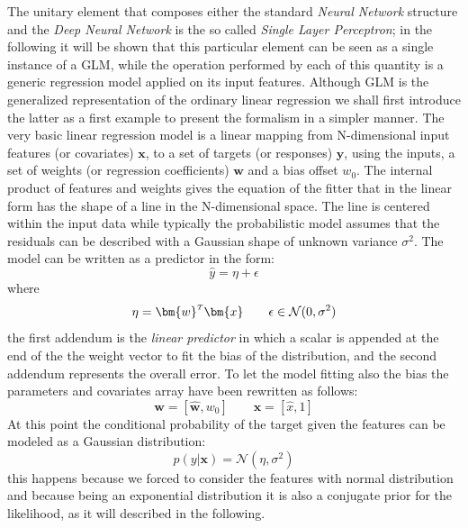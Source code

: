 The unitary element that composes either the standard \textit{Neural Network} structure and the \textit{Deep Neural Network} is the so called \textit{Single Layer Perceptron}; in the following it will be shown that this particular element can be seen as a single instance of a \ac{GLM}, while the operation performed by each of this quantity is a generic regression model applied on its input features.
%
Although GLM is the generalized representation of the ordinary linear regression we shall first introduce the latter as a first example to present the formalism in a simpler manner.
The very basic linear regression model is a linear mapping from N-dimensional input features (or covariates) $\bm{x}$, to a set of targets (or responses) $\bm{y}$, using the inputs, a set of weights (or regression coefficients) $\bm{w}$ and a bias offset $w_0$. The internal product of features and weights gives the equation of the fitter that in the linear form has the shape of a line in the N-dimensional space. The line is centered within the input data while typically the probabilistic model assumes that the residuals can be described with a Gaussian shape of unknown variance $\sigma^2$. The model can be written as a predictor in the form:
\begin{equation}
    \hat{y} = \eta + \epsilon
\end{equation}
where
\begin{equation}
     \eta = \transpose{\bm{w}}\bm{x} \qquad  \epsilon \in \mathcal{N}(0,\sigma^2)
\end{equation}
the first addendum is the \textit{linear predictor} in which a scalar is appended at the end of the the weight vector to fit the bias of the distribution, and the second addendum represents the overall error. To let the model fitting also the bias the parameters and covariates array have been rewritten as follows:
\begin{equation}
    \bm{w} = [\hat{\bm{w}},w_0] \qquad \bm{x} = [\hat{x}, 1]
\end{equation}
At this point the conditional probability of the target given the features can be modeled as a Gaussian distribution:
\begin{equation}
    p(y|\bm{x}) = \mathcal{N}(\eta, \sigma^2)
\end{equation}
this happens because we forced to consider the features with normal distribution and because being an exponential distribution it is also a conjugate prior for the likelihood, as it will described in the following.

